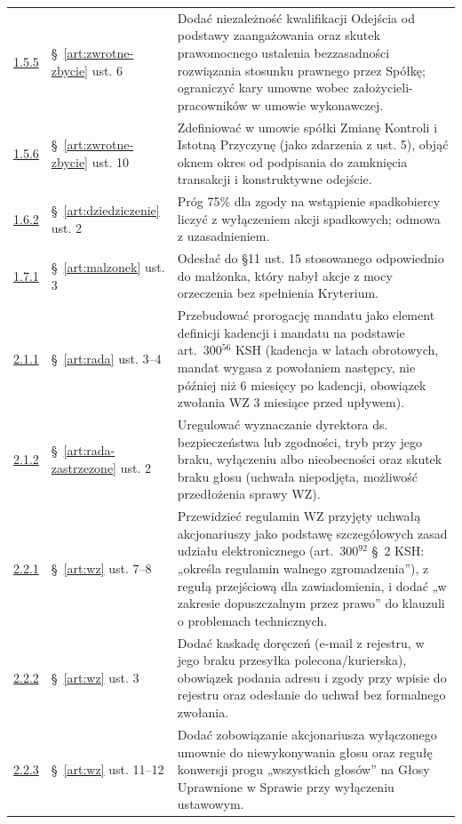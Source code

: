 \documentclass[12pt,a4paper]{report}
\begin{document}
\begin{longtable}{@{}p{1.3cm} p{3.3cm} p{9.6cm}@{}}
\hyperref[memo:1.5.5]{1.5.5} & §~\ref{art:zwrotne-zbycie} ust. 6 & Dodać niezależność kwalifikacji Odejścia od podstawy zaangażowania oraz skutek prawomocnego ustalenia bezzasadności rozwiązania stosunku prawnego przez Spółkę; ograniczyć kary umowne wobec założycieli-pracowników w umowie wykonawczej. \\
\hyperref[memo:1.5.6]{1.5.6} & §~\ref{art:zwrotne-zbycie} ust. 10 & Zdefiniować w umowie spółki Zmianę Kontroli i Istotną Przyczynę (jako zdarzenia z ust. 5), objąć oknem okres od podpisania do zamknięcia transakcji i konstruktywne odejście. \\
\hyperref[memo:1.6.2]{1.6.2} & §~\ref{art:dziedziczenie} ust. 2 & Próg 75\% dla zgody na wstąpienie spadkobiercy liczyć z wyłączeniem akcji spadkowych; odmowa z uzasadnieniem. \\
\hyperref[memo:1.7.1]{1.7.1} & §~\ref{art:malzonek} ust. 3 & Odesłać do §11 ust. 15 stosowanego odpowiednio do małżonka, który nabył akcje z mocy orzeczenia bez spełnienia Kryterium. \\
\hyperref[memo:2.1.1]{2.1.1} & §~\ref{art:rada} ust. 3--4 & Przebudować prorogację mandatu jako element definicji kadencji i mandatu na podstawie art.~300$^{56}$ KSH (kadencja w latach obrotowych, mandat wygasa z powołaniem następcy, nie później niż 6 miesięcy po kadencji, obowiązek zwołania WZ 3 miesiące przed upływem). \\
\hyperref[memo:2.1.2]{2.1.2} & §~\ref{art:rada-zastrzezone} ust. 2 & Uregulować wyznaczanie dyrektora ds. bezpieczeństwa lub zgodności, tryb przy jego braku, wyłączeniu albo nieobecności oraz skutek braku głosu (uchwała niepodjęta, możliwość przedłożenia sprawy WZ). \\
\hyperref[memo:2.2.1]{2.2.1} & §~\ref{art:wz} ust. 7--8 & Przewidzieć regulamin WZ przyjęty uchwałą akcjonariuszy jako podstawę szczegółowych zasad udziału elektronicznego (art.~300$^{92}$ §~2 KSH: „określa regulamin walnego zgromadzenia”), z regułą przejściową dla zawiadomienia, i dodać „w zakresie dopuszczalnym przez prawo” do klauzuli o problemach technicznych. \\
\hyperref[memo:2.2.2]{2.2.2} & §~\ref{art:wz} ust. 3 & Dodać kaskadę doręczeń (e-mail z rejestru, w jego braku przesyłka polecona/kurierska), obowiązek podania adresu i zgody przy wpisie do rejestru oraz odesłanie do uchwał bez formalnego zwołania. \\
\hyperref[memo:2.2.3]{2.2.3} & §~\ref{art:wz} ust. 11--12 & Dodać zobowiązanie akcjonariusza wyłączonego umownie do niewykonywania głosu oraz regułę konwersji progu „wszystkich głosów” na Głosy Uprawnione w Sprawie przy wyłączeniu ustawowym. \\

\end{longtable}
\end{document}
